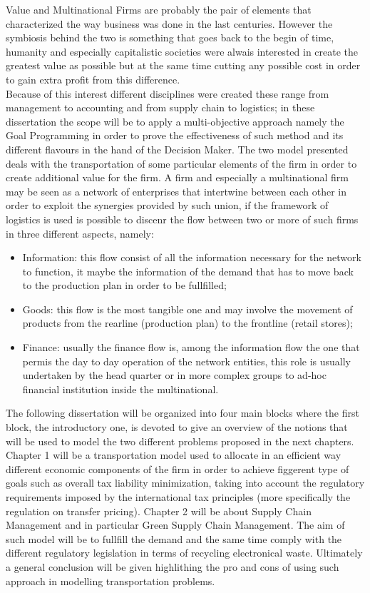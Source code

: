 \begin{doublespace}
Value and Multinational Firms are probably the pair of elements that characterized the way business was done in the last centuries. However the symbiosis behind the two is something that goes back to the begin of time, humanity and especially capitalistic societies were alwais interested in create the greatest value as possible but at the same time cutting any possible cost in order to gain extra profit from this difference.
\\
Because of this interest different disciplines were created these range from management to accounting and from supply chain to logistics; in these dissertation the scope will be to apply a multi-objective approach namely the Goal Programming in order to prove the effectiveness of such method and its different flavours in the hand of the Decision Maker. The two model presented deals with the transportation of some particular elements of the firm in order to create additional value for the firm. A firm and especially a multinational firm may be seen as a network of enterprises that intertwine between each other in order to exploit the synergies provided by such union, if the framework of logistics is used is possible to discenr the flow between two or more of such firms in three different aspects, namely:
\begin{itemize}
	\item Information: this flow consist of all the information necessary for the network to function, it maybe the information of the demand that has to move back to the production plan in order to be fullfilled;
	\item Goods: this flow is the most tangible one and may involve the movement of products from the rearline (production plan) to the frontline (retail stores);
	\item Finance: usually the finance flow is, among the information flow the one that permis the day to day operation of the network entities, this role is usually undertaken by the head quarter or in more complex groups to ad-hoc financial institution inside the multinational. 
\end{itemize}

The following dissertation will be organized into four main blocks where the first block, the introductory one, is devoted to give an overview of the notions that will be used to model the two different problems proposed in the next chapters. Chapter 1 will be a transportation model used to allocate in an efficient way different economic  components of the firm in order to achieve figgerent type of goals such as overall tax liability minimization, taking into account the regulatory requirements imposed by the international tax principles (more specifically the regulation on transfer pricing). Chapter 2 will be about Supply Chain Management and in particular Green Supply Chain Management. The aim of such model will be to fullfill the demand and the same time comply with the different regulatory legislation in terms of recycling electronical waste. Ultimately a general conclusion will be given highlithing the pro and cons of using such approach in modelling transportation problems.


\end{doublespace}
